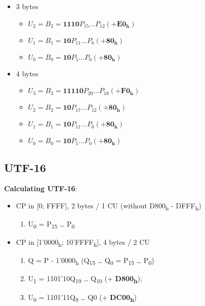 \documentclass[11pt,twoside,landscape]{article}
\begin{document}
\begin{multicols}{3}
\begin{itemize}
\item 3 bytes
  \begin{itemize}
  \item \(U_2 = B_2 = \mathbf{1110}P_15 \dots P_12 (+\mathbf{E0_h})\)
  \item \(U_1 = B_1 = \mathbf{10}P_11 \dots P_6 (+\mathbf{80_h})\)
  \item \(U_0 = B_0 = \mathbf{10}P_5 \dots P_0 (+\mathbf{80_h})\)
  \end{itemize}

\item 4 bytes
  \begin{itemize}
  \item \(U_3 = B_3 = \mathbf{11110}P_20 \dots P_18 (+\mathbf{F0_h})\)
  \item \(U_2 = B_2 = \mathbf{10}P_17 \dots P_12 (+\mathbf{80_h})\)
  \item \(U_1 = B_1 = \mathbf{10}P_11 \dots P_6 (+\mathbf{80_h})\)
  \item \(U_0 = B_0 = \mathbf{10}P_5 \dots P_0 (+\mathbf{80_h})\)
  \end{itemize}
\end{itemize}

\subsection*{UTF-16}
\textbf{Calculating UTF-16}:
\begin{itemize}
\item CP in [0; FFFF], 2 bytes / 1 CU (without D800\textsubscript{h} - DFFF\textsubscript{h})
  \begin{enumerate}
  \item U\textsubscript{0} = P\textsubscript{15} \ldots{} P\textsubscript{0}
  \end{enumerate}

\item CP in [1'0000\textsubscript{h}; 10'FFFF\textsubscript{h}], 4 bytes / 2 CU
  \begin{enumerate}
  \item Q = P - 1'0000\textsubscript{h} (Q\textsubscript{15} \ldots{} Q\textsubscript{0} = P\textsubscript{15} \ldots{} P\textsubscript{0})
  \item U\textsubscript{1} = 1101'10Q\textsubscript{19} \ldots{} Q\textsubscript{10} (+ \textbf{D800\textsubscript{h}});
  \item U\textsubscript{0} = 1101'11Q\textsubscript{9} \ldots{} Q0 (+ \textbf{DC00\textsubscript{h}})
  \end{enumerate}
\end{itemize}


\end{multicols}
\end{document}

